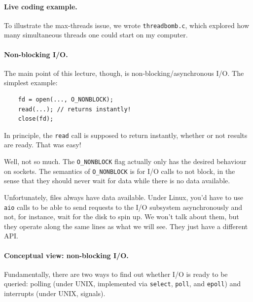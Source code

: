 \documentclass[11pt]{article}
\begin{document}
\paragraph{Live coding example.} To illustrate the max-threads
issue, we wrote {\tt threadbomb.c}, which explored how many simultaneous threads
one could start on my computer.

\paragraph{Non-blocking I/O.} The main point of this lecture, though,
is non-blocking/asynchronous I/O. The simplest example:

\begin{lstlisting}
    fd = open(..., O_NONBLOCK);
    read(...); // returns instantly!
    close(fd);
\end{lstlisting}

In principle, the {\tt read} call is supposed to return instantly,
whether or not results are ready. That was easy!

Well, not so much. The {\tt O\_NONBLOCK} flag actually only has the
desired behaviour on sockets. The semantics of {\tt O\_NONBLOCK} is
for I/O calls to not block, in the sense that they should never wait
for data while there is no data available.

Unfortunately, files always have data available. Under Linux, you'd have
to use {\tt aio} calls to be able to send requests to the I/O subsystem
asynchronously and not, for instance, wait for the disk to spin up.
We won't talk about them, but they operate along the same lines as what
we will see. They just have a different API.

\paragraph{Conceptual view: non-blocking I/O.} Fundamentally,
there are two ways to find out whether I/O is ready to be queried:
polling (under UNIX, implemented via {\tt select}, {\tt poll},
and {\tt epoll}) and interrupts (under UNIX, signals).
\end{document}
